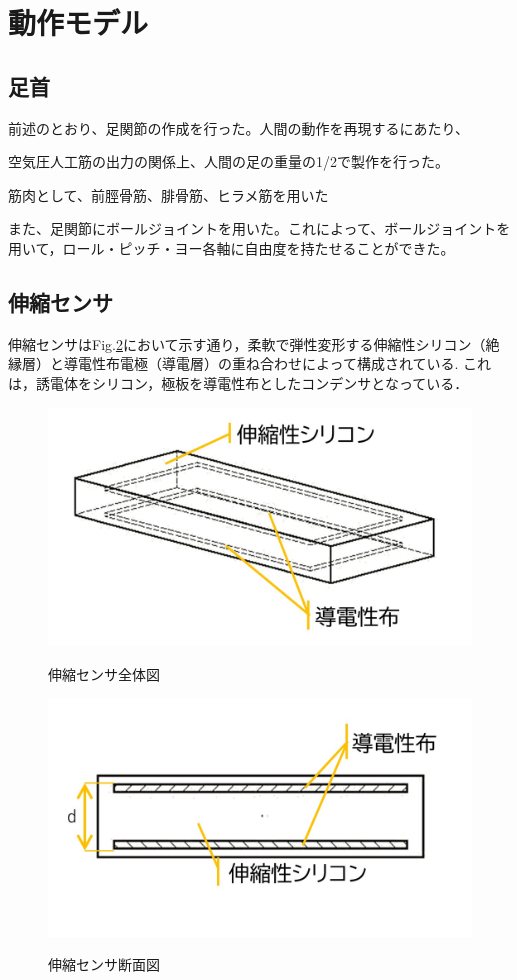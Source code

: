 \section{動作モデル}
\subsection{足首}
前述のとおり、足関節の作成を行った。人間の動作を再現するにあたり、

空気圧人工筋の出力の関係上、人間の足の重量の1/2で製作を行った。

筋肉として、前脛骨筋、腓骨筋、ヒラメ筋を用いた

また、足関節にボールジョイントを用いた。これによって、ボールジョイントを用いて，ロール・ピッチ・ヨー各軸に自由度を持たせることができた。

\subsection{伸縮センサ}
伸縮センサはFig.\ref{伸縮センサ断面図}において示す通り，柔軟で弾性変形する伸縮性シリコン（絶縁層）と導電性布電極（導電層）の重ね合わせによって構成されている.
これは，誘電体をシリコン，極板を導電性布としたコンデンサとなっている．

\begin{figure}[h]
    \begin{center}
        \label{伸縮センサ全体図}
        \includegraphics[width=0.5\columnwidth,clip,bb=0 0 922 518]{Photo/2.実験方法/スライド1.JPG}
        \caption{伸縮センサ全体図}
    \end{center}
\end{figure}
\begin{figure}[h]
    \begin{center}       
        \label{伸縮センサ断面図}
        \includegraphics[width=0.5\columnwidth,clip,bb=0 0 922 518]{Photo/2.実験方法/スライド2.JPG}
        \caption{伸縮センサ断面図}
    \end{center}
\end{figure}

